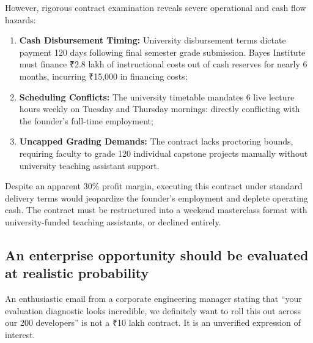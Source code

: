 However, rigorous contract examination reveals severe operational and cash flow hazards:
\begin{enumerate}
\item \textbf{Cash Disbursement Timing:} University disbursement terms dictate payment 120 days following final semester grade submission. Bayes Institute must finance ₹2.8 lakh of instructional costs out of cash reserves for nearly 6 months, incurring ₹15,000 in financing costs;
\item \textbf{Scheduling Conflicts:} The university timetable mandates 6 live lecture hours weekly on Tuesday and Thursday mornings: directly conflicting with the founder's full-time employment;
\item \textbf{Uncapped Grading Demands:} The contract lacks proctoring bounds, requiring faculty to grade 120 individual capstone projects manually without university teaching assistant support.
\end{enumerate}
Despite an apparent 30\% profit margin, executing this contract under standard delivery terms would jeopardize the founder's employment and deplete operating cash. The contract must be restructured into a weekend masterclass format with university-funded teaching assistants, or declined entirely.

\subsection{An enterprise opportunity should be evaluated at realistic probability}

An enthusiastic email from a corporate engineering manager stating that ``your evaluation diagnostic looks incredible, we definitely want to roll this out across our 200 developers'' is not a ₹10 lakh contract. It is an unverified expression of interest.

